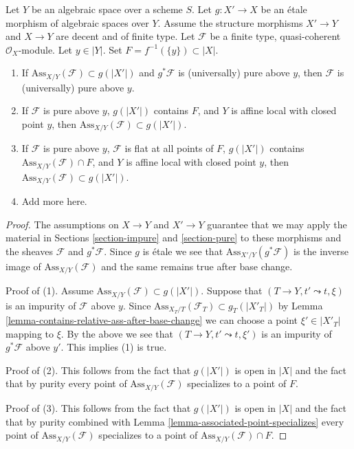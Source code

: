 \begin{lemma}
\label{lemma-pure-on-top}
Let $Y$ be an algebraic space over a scheme $S$. Let $g : X' \to X$ be an
\'etale morphism of algebraic spaces over $Y$. Assume the structure
morphisms $X' \to Y$ and $X \to Y$ are decent and of finite type.
Let $\mathcal{F}$ be a finite type, quasi-coherent $\mathcal{O}_X$-module.
Let $y \in |Y|$. Set $F = f^{-1}(\{y\}) \subset |X|$.
\begin{enumerate}
\item If $\text{Ass}_{X/Y}(\mathcal{F}) \subset g(|X'|)$
and $g^*\mathcal{F}$ is (universally) pure above $y$, then
$\mathcal{F}$ is (universally) pure above $y$.
\item If $\mathcal{F}$ is pure above $y$, $g(|X'|)$ contains $F$, and
$Y$ is affine local with closed point $y$, then
$\text{Ass}_{X/Y}(\mathcal{F}) \subset g(|X'|)$.
\item If $\mathcal{F}$ is pure above $y$, $\mathcal{F}$ is flat
at all points of $F$, $g(|X'|)$ contains
$\text{Ass}_{X/Y}(\mathcal{F}) \cap F$, and $Y$ is affine local
with closed point $y$, then
$\text{Ass}_{X/Y}(\mathcal{F}) \subset g(|X'|)$.
\item Add more here.
\end{enumerate}
\end{lemma}

\begin{proof}
The assumptions on $X \to Y$ and $X' \to Y$ guarantee that
we may apply the material in Sections \ref{section-impure} and
\ref{section-pure}
to these morphisms and the sheaves $\mathcal{F}$ and $g^*\mathcal{F}$.
Since $g$ is \'etale we see that
$\text{Ass}_{X'/Y}(g^*\mathcal{F})$
is the inverse image of $\text{Ass}_{X/Y}(\mathcal{F})$
and the same remains true after base change.

\medskip\noindent
Proof of (1). Assume $\text{Ass}_{X/Y}(\mathcal{F}) \subset g(|X'|)$.
Suppose that $(T \to Y, t' \leadsto t, \xi)$
is an impurity of $\mathcal{F}$ above $y$. Since
$\text{Ass}_{X_T/T}(\mathcal{F}_T) \subset g_T(|X'_T|)$ by
Lemma \ref{lemma-contains-relative-ass-after-base-change}
we can choose
a point $\xi' \in |X'_T|$ mapping to $\xi$. By the above we see
that $(T \to Y, t' \leadsto t, \xi')$ is an impurity of
$g^*\mathcal{F}$ above $y'$. This implies (1) is true.

\medskip\noindent
Proof of (2). This follows from the fact that $g(|X'|)$ is open
in $|X|$ and the fact that by purity every point of
$\text{Ass}_{X/Y}(\mathcal{F})$ specializes to a point of $F$.

\medskip\noindent
Proof of (3). This follows from the fact that $g(|X'|)$ is open
in $|X|$ and the fact that by purity combined with
Lemma \ref{lemma-associated-point-specializes} every point of
$\text{Ass}_{X/Y}(\mathcal{F})$ specializes to a point of
$\text{Ass}_{X/Y}(\mathcal{F}) \cap F$.
\end{proof}


